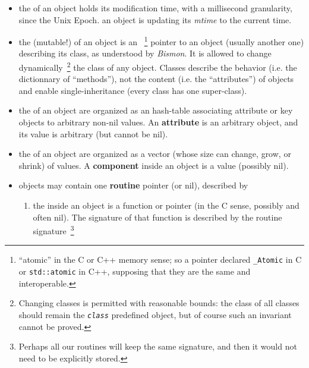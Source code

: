 \begin{itemize}
    \item the  of an object holds its
      modification time, with a millisecond granularity, since the
      Unix Epoch.  an object is updating its
      \emph{mtime} to the current time.

    \item the (mutable!)  of an object is
      an ~\footnote{``atomic'' in the C
        or C++ memory sense; so a pointer declared \texttt{\_Atomic}
        in C or \texttt{std::atomic} in C++, supposing that they are
        the same and interoperable.} pointer to an object (usually
      another one) describing its class, as understood by
      \emph{Bismon}. It is allowed to change
      dynamically~\footnote{Changing classes is permitted with
        reasonable bounds: the class of all classes should remain the
        \emph{\texttt{class}} predefined object, but of course such an
        invariant cannot be proved.} the class of any object. Classes
      describe the behavior (i.e. the dictionnary of ``methods''), not
      the content (i.e. the ``attributes'') of objects and enable
      single-inheritance (every class has one super-class).

    \item the  of an object are
      organized as an hash-table associating attribute or key objects
      to arbitrary non-nil values. An \textbf{attribute} is an
      arbitrary object, and its value is arbitrary (but cannot be
      nil).

    \item the  of an object are
      organized as a vector (whose size can change, grow, or shrink)
      of values. A \textbf{component} inside an object is a value
      (possibly nil).

      \item objects may contain one \textbf{routine} pointer (or nil),
        described by \begin{enumerate}
          
        \item the 
          inside an object is a function or 
          pointer (in the C sense, possibly and often nil). The
          signature of that function is described by the routine
          signature~\footnote{Perhaps all our routines will keep the
            same signature, and then it would not need to be
            explicitly stored.}


\end{enumerate}
\end{itemize}
